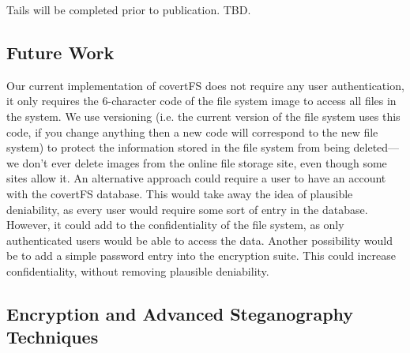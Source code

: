 \documentclass[12pt,journal,compsoc]{IEEEtran}
\begin{document}
Tails will be completed prior to publication. TBD. 

\subsection{Future Work}
Our current implementation of covertFS does not require any user authentication, it only requires the 6-character code of the file system image to access all files in the system. We use versioning (i.e. the current version of the file system uses this code, if you change anything then a new code will correspond to the new file system) to protect the information stored in the file system from being deleted--- we don't ever delete images from the online file storage site, even though some sites allow it. An alternative approach could require a user to have an account with the covertFS database. This would take away the idea of plausible deniability, as every user would require some sort of entry in the database. However, it could add to the confidentiality of the file system, as only authenticated users would be able to access the data.
Another possibility would be to add a simple password entry into the encryption suite. This could increase confidentiality, without removing plausible deniability.


\subsection{Encryption and Advanced Steganography Techniques}
\end{document}
